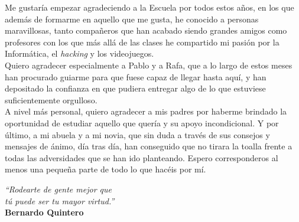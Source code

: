 \vspace{1cm}


Me gustaría empezar agradeciendo a la Escuela por todos estos años, en los que además de formarme en aquello que me gusta, he conocido a personas maravillosas, tanto compañeros que han acabado siendo grandes amigos como profesores con los que más allá de las clases he compartido mi pasión por la Informática, el \textit{hacking} y los videojuegos.\\

Quiero agradecer especialmente a Pablo y a Rafa, que a lo largo de estos meses han procurado guiarme para que fuese capaz de llegar hasta aquí, y han depositado la confianza en que pudiera entregar algo de lo que estuviese suficientemente orgulloso. \\

A nivel más personal, quiero agradecer a mis padres por haberme brindado la oportunidad de estudiar aquello que quería y su apoyo incondicional. Y por último, a mi abuela y a mi novia, que sin duda a través de sus consejos y mensajes de ánimo, día tras día, han conseguido que no tirara la toalla frente a todas las adversidades que se han ido planteando. Espero corresponderos al menos una pequeña parte de todo lo que hacéis por mí.

\newpage

\thispagestyle{empty}

\begin{flushright}
    \small
    \vspace*{\fill}
    \begin{minipage}{0.6\textwidth}
        \begin{flushright}
            \textit{``Rodearte de gente mejor que} \\
            \textit{tú puede ser tu mayor virtud.''} \\
            \textbf{Bernardo Quintero}
        \end{flushright}
    \end{minipage}
    \vspace*{\fill}
\end{flushright}



